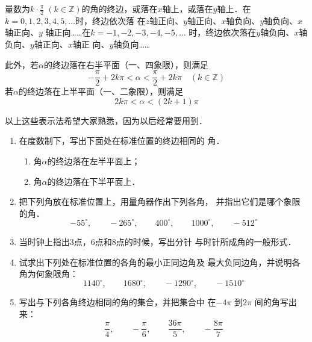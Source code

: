 量数为$k\cdot \frac{\pi}{2}\; (k\in\mathbb{Z})$的角的终边，或落在$x$轴上，或落在$y$轴上．在$k=0,1,2,3,4,5,\ldots$时，终边依次落
在$z$轴正向、$y$轴正向、$x$轴负向、$y$轴负向、$x$轴正向、$y$
轴正向……在$k=-1,-2,-3,-4,-5,\ldots$
时，终边依次落在$y$轴负向、$x$轴负向、$y$轴正向、$x$轴正
向、$y$轴负向……

此外，若$\alpha$的终边落在右半平面（一、四象限），则满足
\[-\frac{\pi}{2}+2k\pi<\alpha<\frac{\pi}{2}+2k\pi\quad (k\in\mathbb{Z})\]
若$\alpha$的终边落在上半平面（一、二象限），则满足
\[2k\pi <\alpha<(2k+1)\pi \]

以上这些表示法希望大家熟悉，因为以后经常要用到．

\begin{ex}
\begin{enumerate}
    \item 在度数制下，写出下面处在标准位置的终边相同的
    角．
        \begin{enumerate}    
    \item 角$\alpha$的终边落在左半平面上；
    \item 角$\alpha$的终边落在下半平面上．     
    \end{enumerate}

    
    \item 把下列角放在标准位置上，用量角器作出下列各角，
    并指出它们是哪个象限的角．
    \[-55^{\circ},\qquad -265^{\circ},\qquad 400^{\circ} ,\qquad 1000^{\circ},\qquad -512^{\circ} \]

    \item 当时钟上指出3点，6点和8点的时候，写出分针
    与时针所成角的一般形式．
    \item 试求出下列处在标准位置的各角的最小正同边角及
    最大负同边角，并说明各角为何象限角：
    \[1140^{\circ},\qquad 1680^{\circ},\qquad -1290^{\circ},\qquad -1510^{\circ}\]
\item 写出与下列各角终边相同的角的集合，并把集合中
在$-4\pi$ 到$2\pi$ 间的角写出来：
\[\frac{\pi}{4},\qquad -\frac{\pi}{6},\qquad \frac{36\pi}{5},\qquad -\frac{8\pi}{7}\]
\end{enumerate} 
\end{ex}

